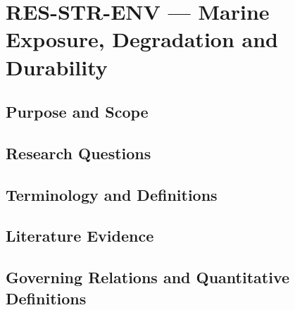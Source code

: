 
\section{RES-STR-ENV --- Marine Exposure, Degradation and Durability}
\label{sec:res-str-env}

\subsection{Purpose and Scope}
\label{sec:res-str-env-purpose}


\subsection{Research Questions}
\label{sec:res-str-env-research-questions}


\subsection{Terminology and Definitions}
\label{sec:res-str-env-definitions}


\subsection{Literature Evidence}
\label{sec:res-str-env-literature-evidence}

%

\subsection{Governing Relations and Quantitative Definitions}
\label{sec:res-str-env-governing-relations}


